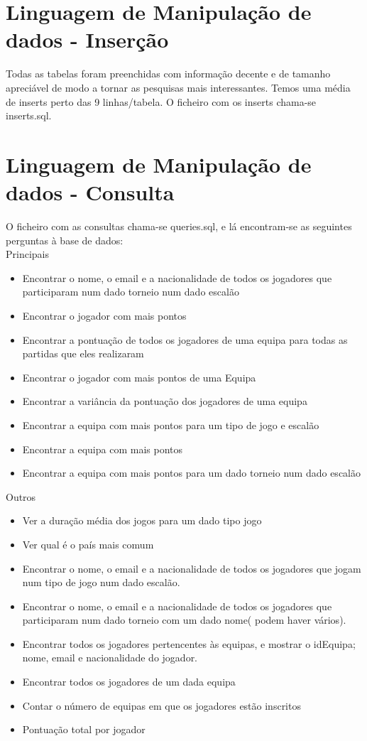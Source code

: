 \documentclass[a4paper]{article}
\begin{document}
\section{Linguagem de Manipulação de dados - Inserção}
Todas as tabelas foram preenchidas com informação decente e de tamanho apreciável de modo a tornar as pesquisas mais interessantes. Temos uma média de inserts perto das 9 linhas/tabela. O ficheiro com os inserts chama-se inserts.sql.

\section{Linguagem de Manipulação de dados - Consulta}
O ficheiro com as consultas chama-se queries.sql, e lá encontram-se as seguintes perguntas à base de dados:
\\\newline
Principais
\begin{itemize}
\item Encontrar o nome, o email e a nacionalidade de todos os jogadores que participaram num dado torneio num dado escalão
\item Encontrar o jogador com mais pontos
\item Encontrar a pontuação de todos os jogadores de uma equipa para todas as partidas que eles realizaram
\item Encontrar o jogador com mais pontos de uma Equipa
\item Encontrar a variância da pontuação dos jogadores de uma equipa
\item Encontrar a equipa com mais pontos para um tipo de jogo e escalão
\item Encontrar a equipa com mais pontos
\item Encontrar a equipa com mais pontos para um dado torneio num dado escalão
\end{itemize}

\newpage

Outros
\begin{itemize}
\item Ver a duração média dos jogos para um dado tipo jogo
\item Ver qual é o país mais comum
\item Encontrar o nome, o email e a nacionalidade de todos os jogadores que jogam num tipo de jogo num dado escalão.
\item Encontrar o nome, o email e a nacionalidade de todos os jogadores que participaram num dado torneio com um dado nome( podem haver vários).
\item Encontrar todos os jogadores pertencentes às equipas, e mostrar o idEquipa; nome, email e nacionalidade do jogador.
\item Encontrar todos os jogadores de um dada equipa
\item Contar o número de equipas em que os jogadores estão inscritos
\item Pontuação total por jogador
\end{itemize}
\end{document}
